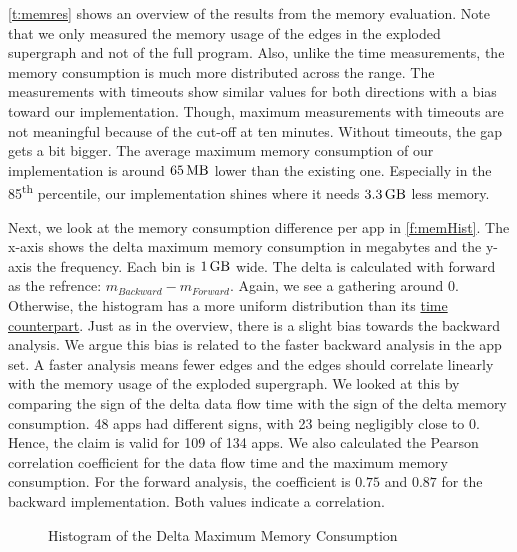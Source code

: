 \documentclass[../draft.tex]{subfiles}
\begin{document}
    \autoref{t:memres} shows an overview of the results from the memory evaluation.
    Note that we only measured the memory usage of the edges in the exploded supergraph and not of the full program.
    Also, unlike the time measurements, the memory consumption is much more distributed across the range.
    The measurements with timeouts show similar values for both directions with a bias toward our implementation.
    Though, maximum measurements with timeouts are not meaningful because of the cut-off at ten minutes.
    Without timeouts, the gap gets a bit bigger.
    The average maximum memory consumption of our implementation is around $\SI{65}{\mega\byte}$ lower than the existing one. 
    Especially in the 85\textsuperscript{th} percentile, our implementation shines where it needs $\SI{3.3}{\giga\byte}$ less memory.

    Next, we look at the memory consumption difference per app in \autoref{f:memHist}.
    The x-axis shows the delta maximum memory consumption in megabytes and the y-axis the frequency.
    Each bin is $\SI{1}{\giga\byte}$ wide.
    The delta is calculated with forward as the refrence: $m_{\mathit{Backward}}-m_{\mathit{Forward}}$.
    Again, we see a gathering around $0$. 
    Otherwise, the histogram has a more uniform distribution than its \hyperref[f:deltaHist]{time counterpart}.
    Just as in the overview, there is a slight bias towards the backward analysis.
    We argue this bias is related to the faster backward analysis in the app set. 
    A faster analysis means fewer edges\footnotemark{} and the edges should correlate linearly with the memory usage of the exploded supergraph.
    We looked at this by comparing the sign of the delta data flow time with the sign of the delta memory consumption. 
    48 apps had different signs, with 23 being negligibly close to 0. 
    Hence, the claim is valid for 109 of 134 apps.
    We also calculated the Pearson correlation coefficient for the data flow time and the maximum memory consumption.
    For the forward analysis, the coefficient is $0.75$ and $0.87$ for the backward implementation.
    Both values indicate a correlation.

    \begin{figure}[tbp]
        \centering
        \resizebox{0.75\columnwidth}{!}{
            
        }
        \caption{Histogram of the Delta Maximum Memory Consumption}
        \label{f:memHist}
    \end{figure}
\end{document}
